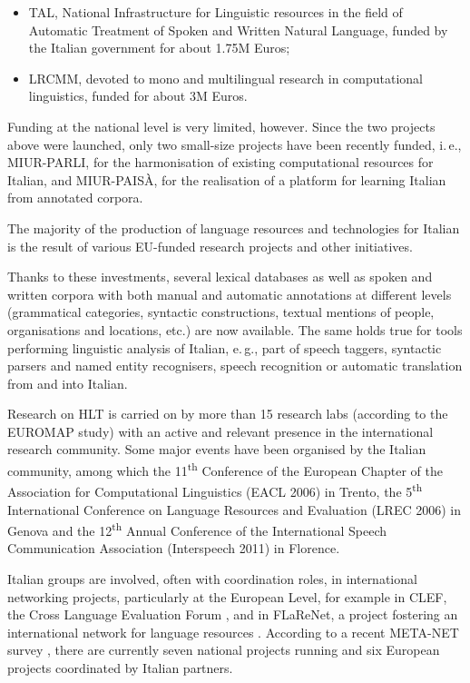 \begin{multicols}{2}
\begin{itemize}
\item TAL, National Infrastructure for Linguistic resources in the field of Automatic Treatment of Spoken and Written Natural Language, funded by the Italian government for about 1.75M Euros;
\item LRCMM, devoted to mono and multilingual research in computational linguistics, funded for about 3M Euros.
\end{itemize}

Funding at the national level is very limited, however. Since the two
projects above were launched, only two small-size projects have been
recently funded, i.\,e., MIUR-PARLI, for the harmonisation of existing computational resources for Italian, and MIUR-PAIS\`{A}, for the realisation of a platform for learning Italian from annotated corpora.

The majority of the production of language resources and technologies
for Italian is the result of various EU-funded research projects and
other initiatives. 

Thanks to these investments, several lexical
databases as well as spoken and written corpora with both manual and
automatic annotations at different levels (grammatical categories,
syntactic constructions, textual mentions of people, organisations and
locations, etc.) are now available. The same holds true for tools
performing linguistic analysis of Italian, e.\,g., part of speech taggers, syntactic parsers and named entity recognisers, speech recognition or automatic translation from and into Italian.

Research on HLT is carried on by more than 15 research labs (according to the
EUROMAP study) with an active and relevant presence in the international
research community. Some major events have been organised by the Italian
community, among which the 11\textsuperscript{th} Conference of the European Chapter of the
Association for Computational Linguistics (EACL 2006) in Trento, the 5\textsuperscript{th}
International Conference on Language Resources and Evaluation (LREC 2006) in
Genova and the 12\textsuperscript{th} Annual Conference of the International Speech
Communication Association (Interspeech 2011) in Florence. 

Italian groups are involved, often with coordination roles, in international networking projects, particularly at the European Level, for example in CLEF, the Cross Language Evaluation Forum \cite{clef}, and in FLaReNet, a project fostering an international network for language resources \cite{flarenet}. According to a recent META-NET survey \cite{soria}, there are currently seven national projects running and six European projects coordinated by Italian partners.


\end{multicols}

